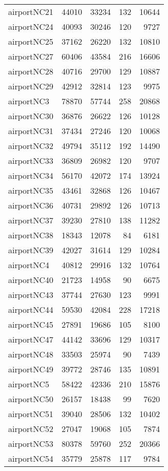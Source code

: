 \begin{tabular}{lrrrr}
airportNC21 & 44010 & 33234 & 132 & 10644 \\
airportNC24 & 40093 & 30246 & 120 & 9727 \\
airportNC25 & 37162 & 26220 & 132 & 10810 \\
airportNC27 & 60406 & 43584 & 216 & 16606 \\
airportNC28 & 40716 & 29700 & 129 & 10887 \\
airportNC29 & 42912 & 32814 & 123 & 9975 \\
airportNC3 & 78870 & 57744 & 258 & 20868 \\
airportNC30 & 36876 & 26622 & 126 & 10128 \\
airportNC31 & 37434 & 27246 & 120 & 10068 \\
airportNC32 & 49794 & 35112 & 192 & 14490 \\
airportNC33 & 36809 & 26982 & 120 & 9707 \\
airportNC34 & 56170 & 42072 & 174 & 13924 \\
airportNC35 & 43461 & 32868 & 126 & 10467 \\
airportNC36 & 40731 & 29892 & 126 & 10713 \\
airportNC37 & 39230 & 27810 & 138 & 11282 \\
airportNC38 & 18343 & 12078 & 84 & 6181 \\
airportNC39 & 42027 & 31614 & 129 & 10284 \\
airportNC4 & 40812 & 29916 & 132 & 10764 \\
airportNC40 & 21723 & 14958 & 90 & 6675 \\
airportNC43 & 37744 & 27630 & 123 & 9991 \\
airportNC44 & 59530 & 42084 & 228 & 17218 \\
airportNC45 & 27891 & 19686 & 105 & 8100 \\
airportNC47 & 44142 & 33696 & 129 & 10317 \\
airportNC48 & 33503 & 25974 & 90 & 7439 \\
airportNC49 & 39772 & 28746 & 135 & 10891 \\
airportNC5 & 58422 & 42336 & 210 & 15876 \\
airportNC50 & 26157 & 18438 & 99 & 7620 \\
airportNC51 & 39040 & 28506 & 132 & 10402 \\
airportNC52 & 27047 & 19068 & 105 & 7874 \\
airportNC53 & 80378 & 59760 & 252 & 20366 \\
airportNC54 & 35779 & 25878 & 117 & 9784 \\

\end{tabular}
